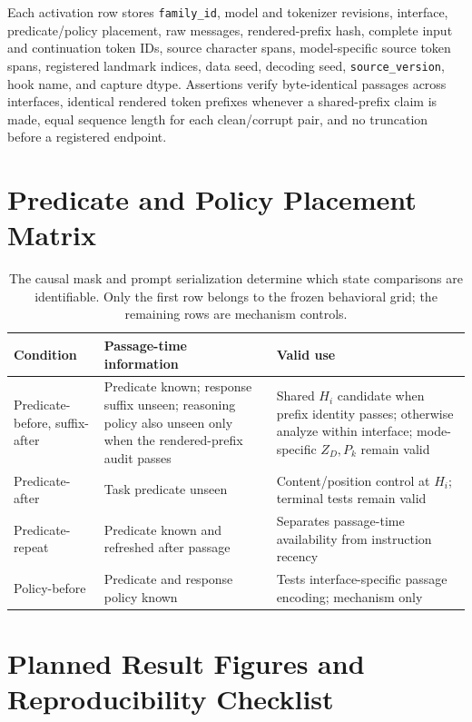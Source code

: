 Each activation row stores
\texttt{family\_id}, model and tokenizer revisions, interface,
predicate/policy placement, raw messages, rendered-prefix hash, complete input
and continuation token IDs, source character spans, model-specific source
token spans, registered landmark indices, data seed, decoding seed,
\texttt{source\_version}, hook name, and capture dtype. Assertions verify
byte-identical passages across interfaces, identical rendered token prefixes
whenever a shared-prefix claim is made, equal sequence length for each
clean/corrupt pair, and no truncation before a registered endpoint.

\section{Predicate and Policy Placement Matrix}
\label{app:placement}

\begin{table}[H]
\centering
\small
\caption{The causal mask and prompt serialization determine which state
comparisons are identifiable. Only the first row belongs to the frozen
behavioral grid; the remaining rows are mechanism controls.}
\begin{tabularx}{\textwidth}{@{}P{.23\textwidth}P{.29\textwidth}Y@{}}
\toprule
Condition & Passage-time information & Valid use \\
\midrule
Predicate-before, suffix-after
  & Predicate known; response suffix unseen; reasoning policy also unseen
  only when the rendered-prefix audit passes
  & Shared \(H_i\) candidate when prefix identity passes; otherwise analyze
  within interface; mode-specific \(Z_D,P_k\) remain valid \\
Predicate-after
  & Task predicate unseen
  & Content/position control at \(H_i\); terminal tests remain valid \\
Predicate-repeat
  & Predicate known and refreshed after passage
  & Separates passage-time availability from instruction recency \\
Policy-before
  & Predicate and response policy known
  & Tests interface-specific passage encoding; mechanism only \\
\bottomrule
\end{tabularx}
\end{table}

\section{Planned Result Figures and Reproducibility Checklist}

